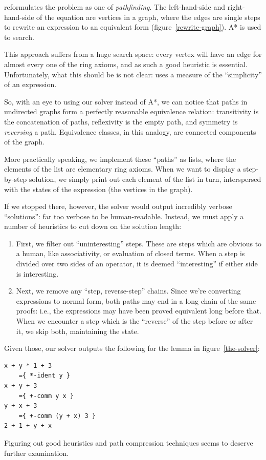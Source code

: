 \documentclass[draft, twocolumn]{article}
\theoremstyle{definition}
\theoremstyle{definition}
\begin{document}
\cite{lioubartsev_constructing_2016} reformulates the problem as one of
\emph{pathfinding}. The left-hand-side and right-hand-side of the equation are
vertices in a graph, where the edges are single steps to rewrite an expression
to an equivalent form (figure~\ref{rewrite-graph}). A* is used to search.

This approach suffers from a huge search space: every vertex will have an edge
for almost every one of the ring axioms, and as such a good heuristic is
essential. Unfortunately, what this should be is not
clear:\cite{lioubartsev_constructing_2016} uses a measure of the ``simplicity''
of an expression.

So, with an eye to using our solver instead of A*, we can notice that paths in
undirected graphs form a perfectly reasonable equivalence relation: transitivity
is the concatenation of paths, reflexivity is the empty path, and symmetry is
\emph{reversing} a path. Equivalence classes, in this analogy, are connected
components of the graph.

More practically speaking, we implement these ``paths'' as lists, where the
elements of the list are elementary ring axioms. When we want to display a
step-by-step solution, we simply print out each element of the list in turn,
interspersed with the states of the expression (the vertices in the graph).

If we stopped there, however, the solver would output incredibly verbose
``solutions'': far too verbose to be human-readable. Instead, we must apply a
number of heuristics to cut down on the solution length:

\begin{enumerate}
  \item First, we filter out ``uninteresting'' steps. These are steps which are
    obvious to a human, like associativity, or evaluation of closed terms. When
    a step is divided over two sides of an operator, it is deemed
    ``interesting'' if either side is interesting.
  \item Next, we remove any ``step, reverse-step'' chains. Since we're
    converting expressions to normal form, both paths may end in a long chain of
    the same proofs: i.e., the expressions may have been proved equivalent long
    before that. When we encounter a step which is the ``reverse'' of the step
    before or after it, we skip both, maintaining the state.
\end{enumerate}

Given those, our solver outputs the following for the lemma in
figure~\ref{the-solver}:
\begin{verbatim}
x + y * 1 + 3
    ={ *-ident y }
x + y + 3
    ={ +-comm y x }
y + x + 3
    ={ +-comm (y + x) 3 }
2 + 1 + y + x
\end{verbatim}
Figuring out good heuristics and path compression techniques seems to deserve
further examination.
\end{document}
